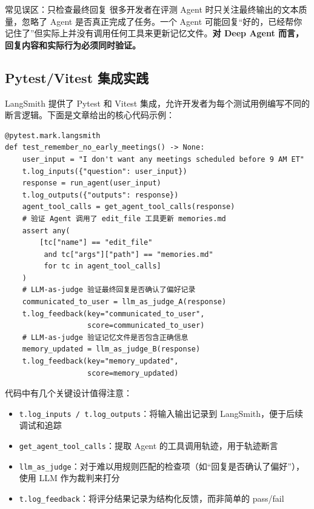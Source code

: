 \documentclass[a4paper]{article}
\begin{document}
\begin{warningbox}{常见误区：只检查最终回复}
很多开发者在评测 Agent 时只关注最终输出的文本质量，忽略了 Agent 是否真正完成了任务。一个 Agent 可能回复``好的，已经帮你记住了''但实际上并没有调用任何工具来更新记忆文件。\textbf{对 Deep Agent 而言，回复内容和实际行为必须同时验证。}
\end{warningbox}

\subsection{Pytest/Vitest 集成实践}

LangSmith 提供了 Pytest 和 Vitest 集成，允许开发者为每个测试用例编写不同的断言逻辑。下面是文章给出的核心代码示例：

\begin{lstlisting}[caption={LangSmith Pytest 集成 --- 定制化 Agent 测试}, label={lst:bespoke-test}]
@pytest.mark.langsmith
def test_remember_no_early_meetings() -> None:
    user_input = "I don't want any meetings scheduled before 9 AM ET"
    t.log_inputs({"question": user_input})
    response = run_agent(user_input)
    t.log_outputs({"outputs": response})
    agent_tool_calls = get_agent_tool_calls(response)
    # 验证 Agent 调用了 edit_file 工具更新 memories.md
    assert any(
        [tc["name"] == "edit_file"
         and tc["args"]["path"] == "memories.md"
         for tc in agent_tool_calls]
    )
    # LLM-as-judge 验证最终回复是否确认了偏好记录
    communicated_to_user = llm_as_judge_A(response)
    t.log_feedback(key="communicated_to_user",
                   score=communicated_to_user)
    # LLM-as-judge 验证记忆文件是否包含正确信息
    memory_updated = llm_as_judge_B(response)
    t.log_feedback(key="memory_updated",
                   score=memory_updated)
\end{lstlisting}

代码中有几个关键设计值得注意：

\begin{itemize}
  \item \texttt{t.log\_inputs / t.log\_outputs}：将输入输出记录到 LangSmith，便于后续调试和追踪
  \item \texttt{get\_agent\_tool\_calls}：提取 Agent 的工具调用轨迹，用于轨迹断言
  \item \texttt{llm\_as\_judge}：对于难以用规则匹配的检查项（如``回复是否确认了偏好''），使用 LLM 作为裁判来打分
  \item \texttt{t.log\_feedback}：将评分结果记录为结构化反馈，而非简单的 pass/fail
\end{itemize}
\end{document}
